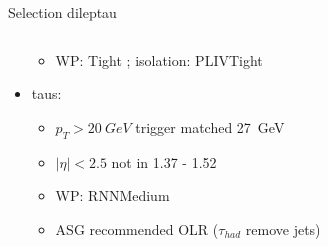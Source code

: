 \begin{frame}{Selection dileptau}
\begin{columns}
\begin{column}{0.7\textwidth}
\begin{itemize}
\begin{itemize}
          \item WP: Tight ; isolation: PLIVTight
        \end{itemize}
        \item taus:
        \vspace*{-0.02\textwidth}
        \begin{itemize}
          \footnotesize
          \item $p_T>\SI{20}{GeV}$ trigger matched \SI{27}{GeV}
          \item $|\eta|<2.5$ not in 1.37 - 1.52
          \item WP: RNNMedium
          \item ASG recommended OLR ($\tau_{had}$ remove jets)
        \end{itemize}
      \end{itemize}
    \end{column}
  \end{columns}
\end{frame}
